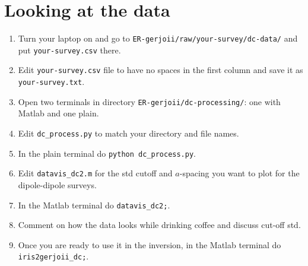 \documentclass[a4paper,12pt]{article}
\begin{document}
\section*{Looking at the data}
\begin{enumerate}
\item Turn your laptop on and go to \texttt{ER-gerjoii/raw/your-survey/dc-data/} and put \texttt{your-survey.csv} there.
\item Edit \texttt{your-survey.csv} file to have no spaces in the first column and save it as \texttt{your-survey.txt}.
\item Open two terminals in directory \texttt{ER-gerjoii/dc-processing/}: one with Matlab and one plain.
\item Edit \texttt{dc\_process.py} to match your directory and file names.
\item In the plain terminal do \texttt{python dc\_process.py}.
\item Edit \texttt{datavis\_dc2.m} for the std cutoff and $a$-spacing you want to plot for the dipole-dipole surveys.
\item In the Matlab terminal do \texttt{datavis\_dc2;}.
\item Comment on how the data looks while drinking coffee and discuss cut-off std.
\item Once you are ready to use it in the inversion, in the Matlab terminal do \texttt{iris2gerjoii\_dc;}.
\end{enumerate}
%
%
%


\end{document}
